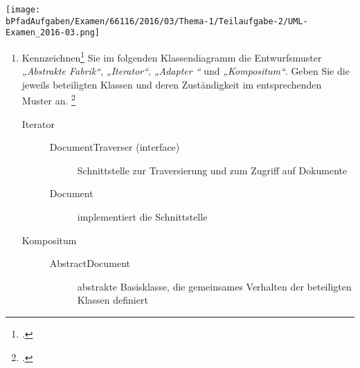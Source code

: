 \documentclass{bschlangaul-aufgabe}
\begin{document}

\texttt{[image: \\bPfadAufgaben/Examen/66116/2016/03/Thema-1/Teilaufgabe-2/UML-Examen\_2016-03.png]}

\begin{enumerate}


\item Kennzeichnen\footcite{examen:66116:2016:03} Sie im folgenden
Klassendiagramm die Entwurfsmuster
\emph{„Abstrakte Fabrik“},
\emph{„Iterator“}, \emph{„Adapter
“} und \emph{„Kompositum“}.
Geben Sie die jeweils beteiligten Klassen und deren Zuständigkeit im
entsprechenden Muster an.
\footcite{sosy:ab:6}

\begin{bAntwort}

\begin{description}

%

\item[Iterator] \strut

\begin{description}
\item[DocumentTraverser (interface)]
Schnittstelle zur Traversierung und zum Zugriff auf Dokumente

\item[Document]
implementiert die Schnittstelle
\end{description}

%

\item[Kompositum] \strut

\begin{description}
\item[AbstractDocument]
abstrakte Basisklasse, die gemeinsames Verhalten der beteiligten
Klassen definiert


\end{description}
\end{description}
\end{bAntwort}
\end{enumerate}
\end{document}
